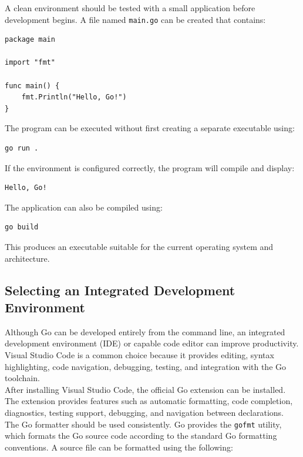 A clean environment should be tested with a small application before development begins. A file named \texttt{main.go} can be created that contains:

\begin{lstlisting}
package main

import "fmt"

func main() {
    fmt.Println("Hello, Go!")
}
\end{lstlisting}

The program can be executed without first creating a separate executable using:

\begin{lstlisting}
go run .
\end{lstlisting}

If the environment is configured correctly, the program will compile and display:

\begin{lstlisting}
Hello, Go!
\end{lstlisting}

The application can also be compiled using:

\begin{lstlisting}
go build
\end{lstlisting}

This produces an executable suitable for the current operating system and architecture.

\subsection{Selecting an Integrated Development Environment}

Although Go can be developed entirely from the command line, an integrated development environment (IDE) or capable code editor can improve productivity. Visual Studio Code is a common choice because it provides editing, syntax highlighting, code navigation, debugging, testing, and integration with the Go toolchain.\\

After installing Visual Studio Code, the official Go extension can be installed. The extension provides features such as automatic formatting, code completion, diagnostics, testing support, debugging, and navigation between declarations.\\

The Go formatter should be used consistently. Go provides the \texttt{gofmt} utility, which formats the Go source code according to the standard Go formatting conventions. A source file can be formatted using the following:

